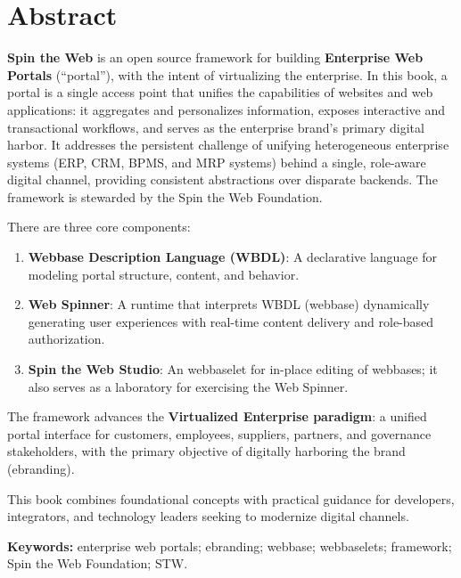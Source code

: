 
\chapter*{Abstract}
\textbf{Spin the Web} is an open source framework for building \textbf{Enterprise Web Portals} (``\gls{portal}''), with the intent of virtualizing the enterprise. In this book, a portal is a single access point that unifies the capabilities of websites and web applications: it aggregates and personalizes information, exposes interactive and transactional workflows, and serves as the enterprise brand's primary digital harbor. It addresses the persistent challenge of unifying heterogeneous enterprise systems (ERP, CRM, BPMS, and MRP systems) behind a single, role-aware digital channel, providing consistent abstractions over disparate backends. The framework is stewarded by the Spin the Web Foundation.

There are three core components:
\begin{enumerate}
\item \textbf{Webbase Description Language (WBDL)}: A declarative language for modeling portal structure, content, and behavior.
\item \textbf{Web Spinner}: A runtime that interprets WBDL (webbase) dynamically generating user experiences with real-time content delivery and role-based authorization.
\item \textbf{Spin the Web Studio}: An webbaselet for in-place editing of webbases; it also serves as a laboratory for exercising the Web Spinner.
\end{enumerate}

The framework advances the \textbf{Virtualized Enterprise paradigm}: a unified portal interface for customers, employees, suppliers, partners, and governance stakeholders, with the primary objective of digitally harboring the brand (\gls{ebranding}).

This book combines foundational concepts with practical guidance for developers, integrators, and technology leaders seeking to modernize digital channels.

\textbf{Keywords:} enterprise web portals; ebranding; webbase; webbaselets; framework; Spin the Web Foundation; STW.

\clearpage
